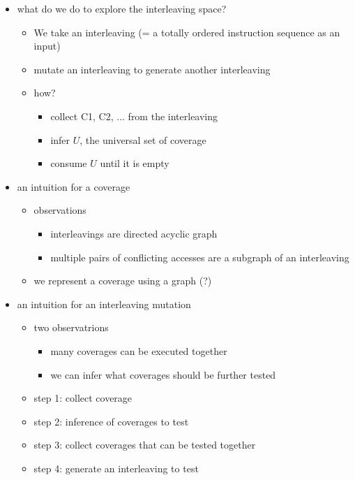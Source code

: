 \begin{itemize}
\item what do we do to explore the interleaving space?
  \begin{itemize}
  \item We take an interleaving (= a totally ordered instruction sequence as an input)
  \item mutate an interleaving to generate another interleaving
  \item how?
    \begin{itemize}
    \item collect {C1, C2, ...} from the interleaving
    \item infer $U$, the universal set of coverage
    \item consume $U$ until it is empty
    \end{itemize}
  \end{itemize}
\item an intuition for a coverage
  \begin{itemize}
    \item observations
      \begin{itemize}
      \item interleavings are directed acyclic graph
      \item multiple pairs of conflicting accesses are a subgraph of an interleaving
      \end{itemize}
  \item we represent a coverage using a graph (?)
  \end{itemize}

\item an intuition for an interleaving mutation 
  \begin{itemize}
  \item two observatrions
    \begin{itemize}
      \item many coverages can be executed together
      \item we can infer what coverages should be further tested
      \end{itemize}
  \item step 1: collect coverage
  \item step 2: inference of coverages to test
  \item step 3: collect coverages that can be tested together
  \item step 4: generate an interleaving to test
  \end{itemize}
\end{itemize}


